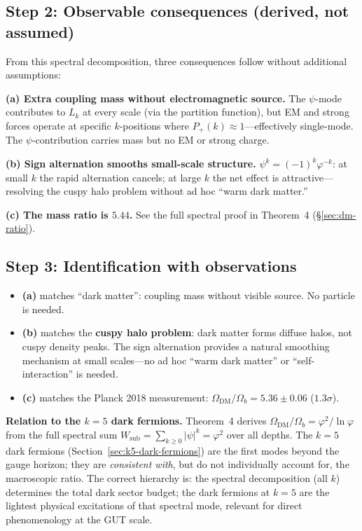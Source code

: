 \documentclass[12pt,a4paper]{article}
\begin{document}
\subsection{Step 2: Observable consequences (derived, not assumed)}

From this spectral decomposition, three consequences follow without additional assumptions:

\textbf{(a) Extra coupling mass without electromagnetic source.}
The $\psi$-mode contributes to $L_k$ at every scale (via the partition function), but EM and strong forces operate at specific $k$-positions where $P_+(k) \approx 1$---effectively single-mode.  The $\psi$-contribution carries mass but no EM or strong charge.

\textbf{(b) Sign alternation smooths small-scale structure.}
$\psi^k = (-1)^k \varphi^{-k}$: at small $k$ the rapid alternation cancels; at large $k$ the net effect is attractive---resolving the cuspy halo problem without ad hoc ``warm dark matter.''

\textbf{(c) The mass ratio is $5.44$.}
See the full spectral proof in Theorem~4 (\S\ref{sec:dm-ratio}).

\subsection{Step 3: Identification with observations}

\begin{itemize}
\item \textbf{(a)} matches ``dark matter'': coupling mass without visible source.  No particle is needed.
\item \textbf{(b)} matches the \textbf{cuspy halo problem}: dark matter forms diffuse halos, not cuspy density peaks. The sign alternation provides a natural smoothing mechanism at small scales---no ad hoc ``warm dark matter'' or ``self-interaction'' is needed.
\item \textbf{(c)} matches the Planck 2018 measurement: $\Omega_{\text{DM}}/\Omega_b = 5.36 \pm 0.06$ ($1.3\sigma$).
\end{itemize}

\textbf{Relation to the $k = 5$ dark fermions.}  Theorem~4 derives $\Omega_{\mathrm{DM}}/\Omega_b = \varphi^2/\ln\varphi$ from the full spectral sum $W_{\mathrm{sub}} = \sum_{k \ge 0} |\psi|^k = \varphi^2$ over all depths.  The $k = 5$ dark fermions (Section~\ref{sec:k5-dark-fermions}) are the first modes beyond the gauge horizon; they are \emph{consistent with}, but do not individually account for, the macroscopic ratio.  The correct hierarchy is: the spectral decomposition (all $k$) determines the total dark sector budget; the dark fermions at $k = 5$ are the lightest physical excitations of that spectral mode, relevant for direct phenomenology at the GUT scale.
\end{document}
